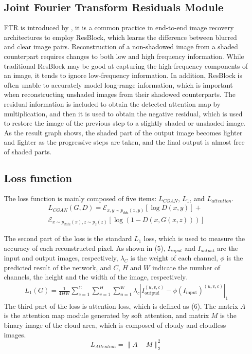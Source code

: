 \documentclass[journal]{IEEEtran}
\begin{document}
\subsection{Joint Fourier Transform Residuals Module}
FTR is introduced by \cite{20}, it is a common practice in end-to-end image recovery architectures to employ ResBlock, which learns the difference between blurred and clear image pairs. Reconstruction of a non-shadowed image from a shaded counterpart requires changes to both low and high frequency information. While traditional ResBlock may be good at capturing the high-frequency components of an image, it tends to ignore low-frequency information. In addition, ResBlock is often unable to accurately model long-range information, which is important when reconstructing unshaded images from their shadowed counterparts. The residual information is included to obtain the detected attention map by multiplication, and then it is used to obtain the negative residual, which is used to restore the image of the previous step to a slightly shaded or unshaded image. As the result graph shows, the shaded part of the output image becomes lighter and lighter as the progressive steps are taken, and the final output is almost free of shaded parts.


\subsection{Loss function}

The loss function is mainly composed of five items: ${L_{CGAN}}$, ${L_{1}}$, and ${L_{attention}}$.
\begin{equation}
\begin{split}
L_{CG A N}(G, D)=\mathcal{E}_{x, y \sim p_{d d a}(x, y)}[\log D(x, y)]+ \\
\mathcal{E}_{x \sim p_{d a t a}(x), z \sim p_{z}(z)}[\log (1-D(x, G(x, z)))]
\end{split}
\end{equation}

The second part of the loss is the standard $L_{1}$ loss, which is used to measure the accuracy of each reconstructed pixel. As shown in (5), $I_{input}$ and $I_{output}$ are the input and output images, respectively, $\lambda_{C}$ is the weight of each channel, $\phi$ is the predicted result of the network, and $C$, $H$ and $W$ indicate the number of channels, the height and the width of the image, respectively.
\begin{equation}
\begin{split}
L_{1}(G)=\frac{1}{4 H W} \sum_{c=1}^{C} \sum_{v=1}^{H} \sum_{u=1}^{W} \lambda_{c}\left|I_{\text {outpud}}^{(u, v, c)}
-\phi\left(I_{\text {input}}\right)^{(u, v, c)}\right|_{1}
\end{split}
\end{equation}
The third part of the loss is attention loss, which is defined as (6). The matrix $A$ is the attention map module generated by soft attention, and matrix $M$ is the binary image of the cloud area, which is composed of cloudy and cloudless images.
\begin{equation}
L_{Attention}=\|A-M\|_{2}^{2}
\end{equation}
\end{document}
